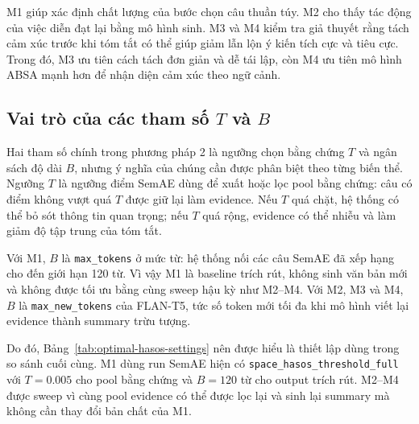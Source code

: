 M1 giúp xác định chất lượng của bước chọn câu thuần túy. M2 cho thấy tác động của việc diễn đạt lại bằng mô hình sinh. M3 và M4 kiểm tra giả thuyết rằng tách cảm xúc trước khi tóm tắt có thể giúp giảm lẫn lộn ý kiến tích cực và tiêu cực. Trong đó, M3 ưu tiên cách tách đơn giản và dễ tái lập, còn M4 ưu tiên mô hình ABSA mạnh hơn để nhận diện cảm xúc theo ngữ cảnh.

\subsection{Vai trò của các tham số \(T\) và \(B\)}

Hai tham số chính trong phương pháp 2 là ngưỡng chọn bằng chứng \(T\) và ngân sách độ dài \(B\), nhưng ý nghĩa của chúng cần được phân biệt theo từng biến thể. Ngưỡng \(T\) là ngưỡng điểm SemAE dùng để xuất hoặc lọc pool bằng chứng: câu có điểm không vượt quá \(T\) được giữ lại làm evidence. Nếu \(T\) quá chặt, hệ thống có thể bỏ sót thông tin quan trọng; nếu \(T\) quá rộng, evidence có thể nhiễu và làm giảm độ tập trung của tóm tắt.

Với M1, \(B\) là \texttt{max\_tokens} ở mức từ: hệ thống nối các câu SemAE đã xếp hạng cho đến giới hạn 120 từ. Vì vậy M1 là baseline trích rút, không sinh văn bản mới và không được tối ưu bằng cùng sweep hậu kỳ như M2--M4. Với M2, M3 và M4, \(B\) là \texttt{max\_new\_tokens} của FLAN-T5, tức số token mới tối đa khi mô hình viết lại evidence thành summary trừu tượng.

Do đó, Bảng~\ref{tab:optimal-hasos-settings} nên được hiểu là thiết lập dùng trong so sánh cuối cùng. M1 dùng run SemAE hiện có \texttt{space\_hasos\_threshold\_full} với \(T=0.005\) cho pool bằng chứng và \(B=120\) từ cho output trích rút. M2--M4 được sweep vì cùng pool evidence có thể được lọc lại và sinh lại summary mà không cần thay đổi bản chất của M1.

